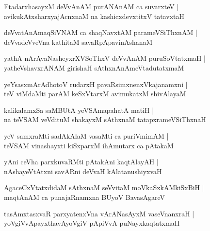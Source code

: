 \documentclass[twoside,12pt,openright]{book}
\newcounter{shloka}[chapter]
\begin{document}
\begin{shloka}
EtadarxhasayxM deVvAnAM purANAnAM ca suvarxteV |\\
avikukAtxsharxyajAcnxnaM na kashicxdevxtitxV tatavxtaH 
\end{shloka}

\begin{shloka}
deVvatAnAmaqSiVNAM  ca shaqNavxtAM parameVSiThxnAM |\\
deVvadeVveVna kathitaM savaRpApavinAshanaM 
\end{shloka}

\begin{shloka}
yathA nArAyaNasheyxrXVSoThxV deVvAnAM puruSoVtatxmaH |\\
yatheVshavxrANAM girishaH sAthxnAnAmeVtadutatxmaM 
\end{shloka}

\begin{shloka}
yeYsasxmArAdhotoV rudarxH pavaRsimxnenxVkajanamxni |\\
teV viMdaMti parAM keSxVtarxM avimukatxM shivAlayaM 
\end{shloka}

\begin{shloka}
kalikalamxSa saMBUtA yeVSAmapahatA matiH |\\
na teVSAM veVdituM shakayxM sAthxnaM tatapxrameVSiThxnaH 
\end{shloka}

\begin{shloka}
yeV samxraMti sadAkAlaM vasaMti ca puriVmimAM |\\
teVSAM vinashayxti kiSxparxM ihAmutarx ca pAtakaM 
\end{shloka}

\begin{shloka}
yAni ceVha parxkuvaRMti pAtakAni kaqtAlayAH |\\
nAshayeVtAtxni savARni deVvaH kAlatanushiyxvaH 
\end{shloka}

\begin{shloka}
AgaceCxVtatxdidaM sAthxnaM seVvitaM moVkaSxkAMkiSxBiH |\\
maqtAnAM ca punajaRnamxna BUyoV BavasAgareV
\end{shloka}

\begin{shloka}
tasAmxtasxvaR parxyatenxVna vArANasAyxM vaseVnanxraH |\\
yoVgiVvApayxthavAyoVgiV pApiVvA puNayxkaqtatxmaH 
\end{shloka}
\end{document}
